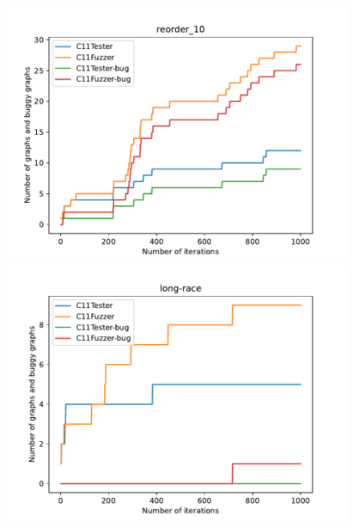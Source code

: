 \begin{figure}[H]

	\centering
	\begin{minipage}{0.45\textwidth}
		\centering
		\includegraphics[width=\textwidth]{figure/hardbug/reorder_10_bug.pdf}
	\end{minipage}
	\hfill
	\begin{minipage}{0.45\textwidth}
		\centering
		\includegraphics[width=\textwidth]{figure/hardbug/long-race_bug.pdf}
	\end{minipage}

	\vspace{0.5cm}


\end{figure}
